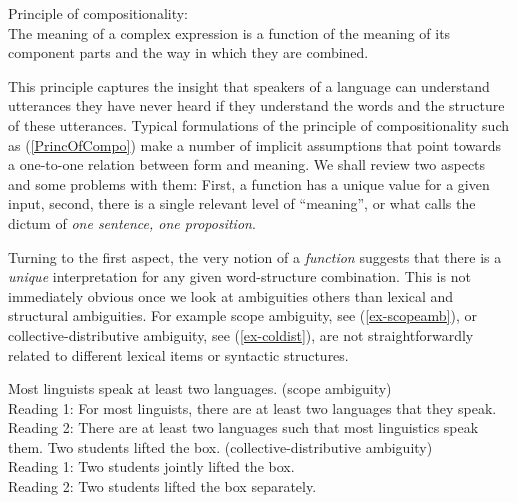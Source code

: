 \documentclass[output=paper]{langscibook}
\begin{document}
\ea Principle of compositionality:\\
The meaning of a complex expression is a function of the meaning of
its component parts and the way in which they are
combined.\label{PrincOfCompo}  \z

This principle captures the insight that speakers of a language can
understand utterances they have never heard if they understand the
words and the structure of these utterances.  Typical formulations
of the principle of compositionality such as (\ref{PrincOfCompo})
make a number of implicit assumptions that point towards a one-to-one
relation between form and meaning.  We shall review two aspects and
some problems with them: First, a function has a unique value for a
given input, second, there is a single relevant level of ``meaning'',
or what \citet{Bach:99} calls the dictum of \emph{one sentence, one
  proposition}.

Turning to the first aspect, the very notion of a \emph{function}
suggests that there is a \emph{unique} interpretation for any given
word-structure combination.  This is not immediately obvious once we
look at ambiguities others than lexical and structural ambiguities.
For example scope ambiguity, see (\ref{ex-scopeamb}), or
collective-distributive ambiguity, see (\ref{ex-coldist}), are not
straightforwardly related to different lexical items or syntactic
structures.

\ea
\begin{xlist}
\ex Most linguists speak at least two languages. \hfill (scope ambiguity)\label{ex-scopeamb}\\
Reading 1: For most linguists, there are at least two languages that they speak. %
\\
Reading 2: There are at least two languages such that most linguistics speak them.
\ex Two students lifted the box. \hfill (collective-distributive ambiguity)\label{ex-coldist}\\
Reading 1: Two students jointly lifted the box.\\
Reading 2: Two students lifted the box separately.
\end{xlist}
\z 
\end{document}

